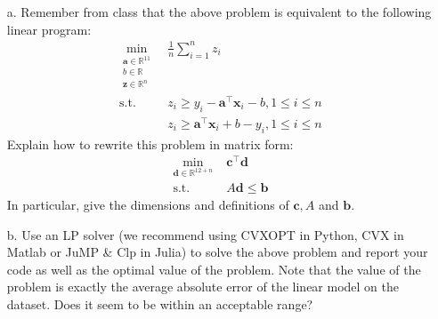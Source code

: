 \documentclass[11pt]{article}
\theoremstyle{remark}
\newcommand{\R}{\mathbb{R}}                     %
\newcommand{\bx}{\mathbf{x}}
\newcommand{\bb}{\mathbf{b}}
\newcommand{\bd}{\mathbf{d}}
\newcommand{\ba}{\mathbf{a}}
\newcommand{\bc}{\mathbf{c}}
\newcommand{\bz}{\mathbf{z}}
\begin{document}
\begin{itemize}
    \item[a.] Remember from class that the above problem is equivalent to the
        following linear program:
        \begin{displaymath}
            \begin{aligned}
            \min_{\substack{\ba\in\R^{11}\\ b\in\R\\\bz\in\R^n}}
            &\;\frac{1}{n}\sum_{i=1}^n z_i\\
            \text{s.t.}&\; z_i\geq y_i - \ba^\intercal \bx_i - b, 1\leq i\leq n\\
                    &\; z_i\geq\ba^\intercal \bx_i + b - y_i, 1\leq i \leq n
        \end{aligned}
        \end{displaymath}
        Explain how to rewrite this problem in matrix form:
        \begin{displaymath}
            \begin{aligned}
                \min_{\bd\in\R^{12+n}}
            &\;\bc^\intercal\bd\\
            \text{s.t.}&\; A\bd\leq \bb
        \end{aligned}
        \end{displaymath}
        In particular, give the dimensions and definitions of $\bc, A$ and $\bb$.
    \item[b.] Use an LP solver  (we recommend using CVXOPT in Python,
      CVX in Matlab or JuMP \& Clp in Julia) to solve the
        above problem and report your code as well as the optimal value of the
        problem. Note that the value of the problem is exactly the average
        absolute error of the linear model on the dataset. Does it seem to be
        within an acceptable range?
\end{itemize}
\end{document}
